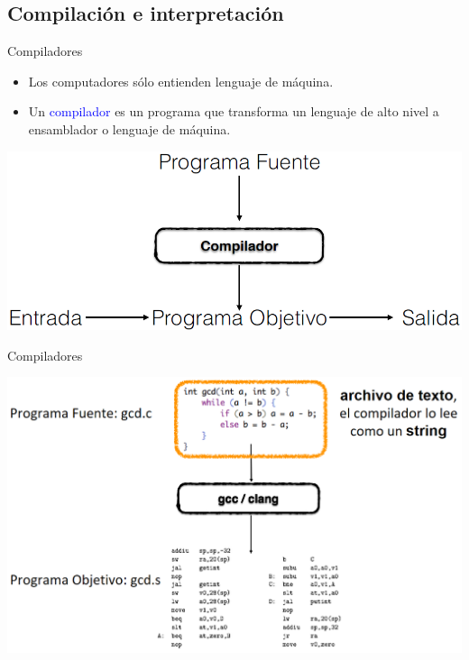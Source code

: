 \documentclass{beamer} %
\newcommand{\blue}[1]{\textcolor{blue}{#1}}
\begin{document}
\subsection{Compilación e interpretación}

\begin{frame}{Compiladores}
    \begin{itemize}
      \item Los computadores sólo entienden lenguaje de máquina.
      \item Un \blue{compilador} es un programa que transforma un lenguaje de alto nivel a ensamblador o lenguaje de máquina.
    \end{itemize}
    \begin{center}
      \includegraphics[width=.8\textwidth]{./image/cap1/compilador}
    \end{center}
\end{frame}

\begin{frame}{Compiladores}
    \begin{center}
      \includegraphics[width=\textwidth]{./image/cap1/compilador-ejemplo}
    \end{center}
\end{frame}
\end{document}
